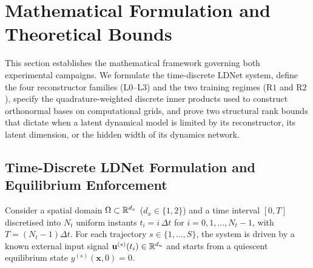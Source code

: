 \section{Mathematical Formulation and Theoretical Bounds}
\label{sec:math}

This section establishes the mathematical framework governing both experimental campaigns. We formulate the time-discrete LDNet system, define the four reconstructor families ($\mathrm{L0}$--$\mathrm{L3}$) and the two training regimes ($\mathrm{R1}$ and $\mathrm{R2}$), specify the quadrature-weighted discrete inner products used to construct orthonormal bases on computational grids, and prove two structural rank bounds that dictate when a latent dynamical model is limited by its reconstructor, its latent dimension, or the hidden width of its dynamics network.

\subsection{Time-Discrete LDNet Formulation and Equilibrium Enforcement}

Consider a spatial domain $\Omega \subset \mathbb{R}^{d_x}$ ($d_x \in \{1,2\}$) and a time interval $[0,T]$ discretised into $N_t$ uniform instants $t_i = i\,\Delta t$ for $i = 0, 1, \dots, N_t - 1$, with $T = (N_t - 1)\Delta t$. For each trajectory $s \in \{1,\dots,S\}$, the system is driven by a known external input signal $\mathbf{u}^{(s)}(t_i) \in \mathbb{R}^{d_u}$ and starts from a quiescent equilibrium state $y^{(s)}(\mathbf{x}, 0) = 0$.

